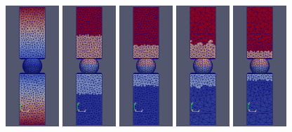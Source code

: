 \begin{figure}
\begin{center}
\includegraphics[width=0.18\textwidth]{tall_size.png}
\includegraphics[width=0.18\textwidth]{tall_input.png}
\includegraphics[width=0.18\textwidth]{tall_predictive.png}
\includegraphics[width=0.18\textwidth]{tall_adapted.png}
\includegraphics[width=0.18\textwidth]{tall_post.png}

\end{center}
\end{figure}
